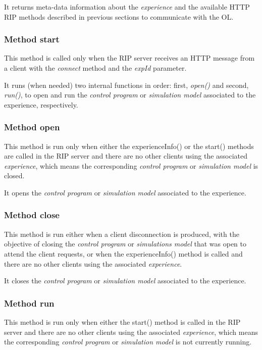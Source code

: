It returns meta-data information about the \textit{experience} and the available HTTP RIP methods described in previous sections to communicate with the OL.

\subsubsection{Method start}
This method is called only when the RIP server receives an HTTP message from a client with the \textit{connect} method and the \textit{expId} parameter.

It runs (when needed) two internal functions in order: first, \textit{open()} and second, \textit{run()}, to open and run the \textit{control program} or \textit{simulation model} associated to the experience, respectively.

\subsubsection{Method open}
This method is run only when either the experienceInfo() or the start() methods are called in the RIP server and there are no other clients using the associated \textit{experience}, which means the corresponding \textit{control program} or \textit{simulation model} is closed.

It opens the \textit{control program} or \textit{simulation model} associated to the experience.

\subsubsection{Method close}
This method is run either when a client disconnection is produced, with the objective of closing the \textit{control program} or \textit{simulations model} that was open to attend the client requests, or when the experienceInfo() method is called and there are no other clients using the associated \textit{experience}.

It closes the \textit{control program} or \textit{simulation model} associated to the experience.

\subsubsection{Method run}
This method is run only when either the start() method is called in the RIP server and there are no other clients using the associated \textit{experience}, which means the corresponding \textit{control program} or \textit{simulation model} is not currently running.

